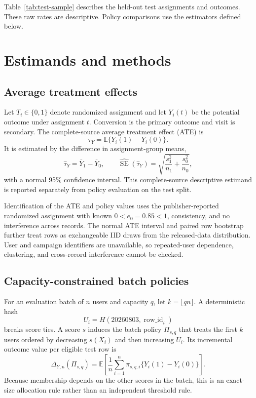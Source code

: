 \documentclass[11pt]{article}
\begin{document}
Table~\ref{tab:test-sample} describes the held-out test assignments and outcomes. These raw rates are descriptive. Policy comparisons use the estimators defined below.

\begin{table}[htbp]
\centering
\caption{Held-out test sample by randomized assignment. Rates are observed sample proportions.}
\label{tab:test-sample}
\resizebox{\textwidth}{!}{}
\end{table}

\section{Estimands and methods}

\subsection{Average treatment effects}

Let $T_i\in\{0,1\}$ denote randomized assignment and let $Y_i(t)$ be the potential outcome under assignment $t$. Conversion is the primary outcome and visit is secondary. The complete-source average treatment effect (ATE) is
\[
\tau_Y = \mathbb{E}\{Y_i(1)-Y_i(0)\}.
\]
It is estimated by the difference in assignment-group means,
\[
\widehat{\tau}_Y=\overline{Y}_1-\overline{Y}_0,
\qquad
\widehat{\operatorname{SE}}(\widehat{\tau}_Y)
=\sqrt{\frac{s_1^2}{n_1}+\frac{s_0^2}{n_0}},
\]
with a normal 95\% confidence interval. This complete-source descriptive estimand is reported separately from policy evaluation on the test split.

Identification of the ATE and policy values uses the publisher-reported randomized assignment with known $0<e_0=0.85<1$, consistency, and no interference across records. The normal ATE interval and paired row bootstrap further treat rows as exchangeable IID draws from the released-data distribution. User and campaign identifiers are unavailable, so repeated-user dependence, clustering, and cross-record interference cannot be checked.

\subsection{Capacity-constrained batch policies}

For an evaluation batch of $n$ users and capacity $q$, let $k=\lfloor qn\rfloor$. A deterministic hash
\[
U_i=H(20260803,\operatorname{row\_id}_i)
\]
breaks score ties. A score $s$ induces the batch policy $\Pi_{s,q}$ that treats the first $k$ users ordered by decreasing $s(X_i)$ and then increasing $U_i$. Its incremental outcome value per eligible test row is
\[
\Delta_{Y,n}(\Pi_{s,q})
=\mathbb{E}\left[
\frac{1}{n}\sum_{i=1}^{n}
\pi_{s,q,i}\{Y_i(1)-Y_i(0)\}
\right].
\]
Because membership depends on the other scores in the batch, this is an exact-size allocation rule rather than an independent threshold rule.
\end{document}
